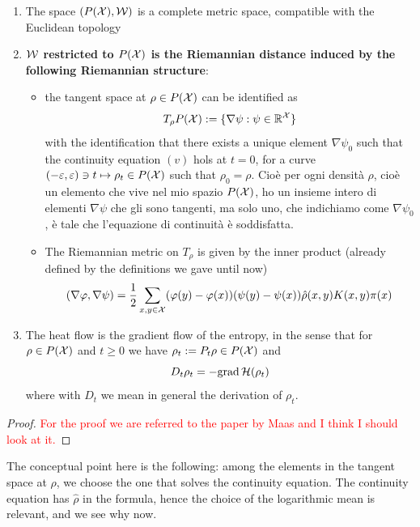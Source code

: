 \begin{theorem}
    \begin{enumerate}
        \item The space $(P(\mathcal{X}),\mathcal{W})$ is a complete metric space, compatible with the Euclidean topology
        \item \textbf{$\mathcal{W}$ restricted to $P(\mathcal{X})$ is the Riemannian distance induced by the following Riemannian structure}:
        \begin{itemize}
            \item the tangent space at $\rho \in P(\mathcal{X})$ can be identified as 
            \[
            T_\rho P(\mathcal{X}):=\{\nabla \psi:\psi \in \mathbb{R}^{\mathcal{X}}\}
            \]
            with the identification that there exists a unique element $\nabla\psi_0$ such that the continuity equation $(v)$ hols at $t=0$, for a curve $(-\varepsilon,\varepsilon) \ni t \mapsto \rho_t \in P(\mathcal{X})$ such that $\rho_0=\rho$. Cioè per ogni densità $\rho$, cioè un elemento che vive nel mio spazio $P(\mathcal{X})$, ho un insieme intero di elementi $\nabla \psi$ che gli sono tangenti,  ma solo uno, che indichiamo come $\nabla \psi_0$, è tale che l'equazione di continuità è soddisfatta. 
            \item The Riemannian metric on $T_\rho$ is given by the inner product (already defined by the definitions we gave until now)
            \[
            (\nabla \varphi, \nabla \psi)=\frac{1}{2}\sum_{x,y\in\mathcal{X}} (\varphi(y)-\varphi(x))(\psi(y)-\psi(x))\hat\rho(x,y)K(x,y)\pi(x)
            \]
        \end{itemize}
        \item The heat flow is the gradient flow of the entropy, in the sense that for $\rho \in P(\mathcal{X})$ and $t\ge 0$ we have $\rho_t:=P_t\rho\in P(\mathcal{X})$ and
        \[
        D_t \rho_t = -\text{grad}\,\mathcal{H}(\rho_t)
        \]
        where with $D_t$ we mean in general the derivation of $\rho_t$. 
    \end{enumerate}
    \begin{proof}
        \textcolor{red}{For the proof we are referred to the paper by Maas and I think I should look at it.}
    \end{proof}
\end{theorem}
The conceptual point here is the following: among the elements in the tangent space at $\rho$, we choose the one that solves the continuity equation. The continuity equation has $\hat\rho$ in the formula, hence the choice of the logarithmic mean is relevant, and we see why now. 
\\

